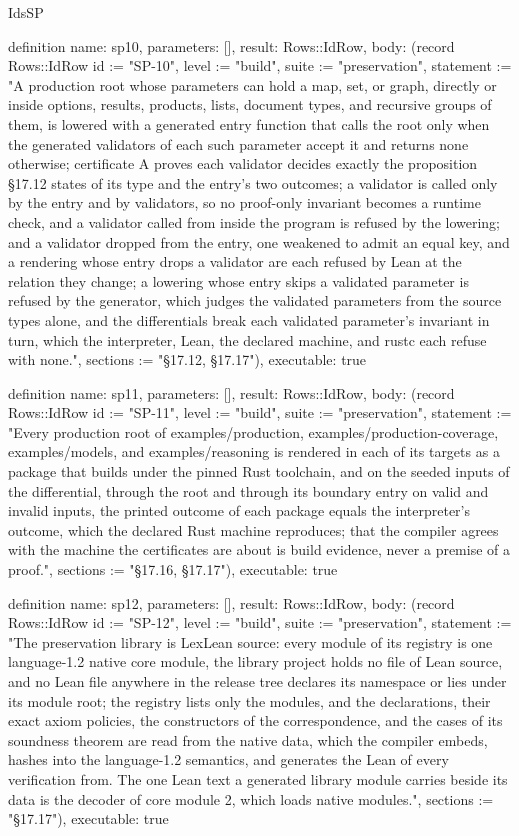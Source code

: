 \begin{lexlean}{IdsSP}
\begin{semanticmodule}
definition{
  name: sp10,
  parameters: [],
  result: Rows::IdRow,
  body: (record Rows::IdRow {id := "SP-10", level := "build", suite := "preservation", statement := "A production root whose parameters can hold a map, set, or graph, directly or inside options, results, products, lists, document types, and recursive groups of them, is lowered with a generated entry function that calls the root only when the generated validators of each such parameter accept it and returns none otherwise; certificate A proves each validator decides exactly the proposition §17.12 states of its type and the entry's two outcomes; a validator is called only by the entry and by validators, so no proof-only invariant becomes a runtime check, and a validator called from inside the program is refused by the lowering; and a validator dropped from the entry, one weakened to admit an equal key, and a rendering whose entry drops a validator are each refused by Lean at the relation they change; a lowering whose entry skips a validated parameter is refused by the generator, which judges the validated parameters from the source types alone, and the differentials break each validated parameter's invariant in turn, which the interpreter, Lean, the declared machine, and rustc each refuse with none.", sections := "§17.12, §17.17"}),
  executable: true
}

definition{
  name: sp11,
  parameters: [],
  result: Rows::IdRow,
  body: (record Rows::IdRow {id := "SP-11", level := "build", suite := "preservation", statement := "Every production root of examples/production, examples/production-coverage, examples/models, and examples/reasoning is rendered in each of its targets as a package that builds under the pinned Rust toolchain, and on the seeded inputs of the differential, through the root and through its boundary entry on valid and invalid inputs, the printed outcome of each package equals the interpreter's outcome, which the declared Rust machine reproduces; that the compiler agrees with the machine the certificates are about is build evidence, never a premise of a proof.", sections := "§17.16, §17.17"}),
  executable: true
}

definition{
  name: sp12,
  parameters: [],
  result: Rows::IdRow,
  body: (record Rows::IdRow {id := "SP-12", level := "build", suite := "preservation", statement := "The preservation library is LexLean source: every module of its registry is one language-1.2 native core module, the library project holds no file of Lean source, and no Lean file anywhere in the release tree declares its namespace or lies under its module root; the registry lists only the modules, and the declarations, their exact axiom policies, the constructors of the correspondence, and the cases of its soundness theorem are read from the native data, which the compiler embeds, hashes into the language-1.2 semantics, and generates the Lean of every verification from. The one Lean text a generated library module carries beside its data is the decoder of core module 2, which loads native modules.", sections := "§17.17"}),
  executable: true
}


\end{semanticmodule}
\end{lexlean}
